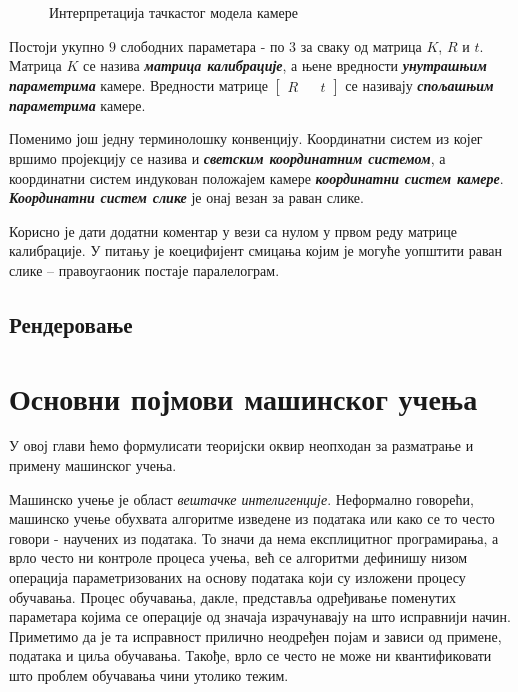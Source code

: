 \documentclass[12pt, a4paper, twoside]{book}
\numberwithin{equation}{chapter}
\numberwithin{theorem}{section}
\numberwithin{definition}{section}
\numberwithin{definitionChapter}{chapter}
\begin{document}
\begin{figure}[H]
\begin{center}
		\end{center}
		\caption{Интерпретација тачкастог модела камере}
		\label{fig-pinhole}
	\end{figure}
	
	Постоји укупно $9$ слободних параметара - по $3$ за сваку од матрица $K$, $R$ и $t$.
	Матрица $K$ се назива \textbf{\textit{матрица калибрације}}, а њене вредности \textbf{\textit{унутрашњим параметрима}}
	камере. Вредности матрице $\begin{bmatrix}R && t\end{bmatrix}$ се називају \textbf{\textit{спољашњим параметрима}}
	камере.
	
	Поменимо још једну терминолошку конвенцију. Координатни систем из којег вршимо пројекцију се 
	назива и \textbf{\textit{светским координатним системом}}, а координатни систем индукован положајем
	камере \textbf{\textit{координатни систем камере}}. \textbf{\textit{Координатни систем слике}} је
	онај везан за раван слике.

	Корисно је дати додатни коментар у вези са нулом у првом реду матрице калибрације. У питању је коецифијент
	смицања којим је могуће уопштити раван слике -- правоугаоник постаје паралелограм.

\section{Рендеровање}

\chapter{Основни појмови машинског учења}
У овој глави ћемо формулисати теоријски оквир неопходан за разматрање и примену машинског учења.

Машинско учење је област \textit{вештачке интелигенције}. Неформално говорећи, машинско учење
обухвата алгоритме изведене из података или како се то често говори - научених из података.
То значи да нема експлицитног програмирања, а врло често ни контроле процеса учења, већ се
алгоритми дефинишу низом операција параметризованих на основу података који су изложени
процесу обучавања. Процес обучавања, дакле, представља одређивање поменутих параметара
којима се операције од значаја израчунавају на што исправнији начин. Приметимо да је та
исправност прилично неодређен појам и зависи од примене, података и циља обучавања. Такође,
врло се често не може ни квантификовати што проблем обучавања чини утолико тежим.
\end{document}
